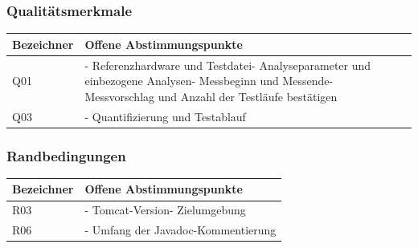 \documentclass[a4paper,10pt]{article}
\begin{document}
        \subsubsection*{Qualitätsmerkmale}
        \begin{longtable}{>{\raggedright\arraybackslash}p{}>{\raggedright\arraybackslash}p{}}

            \toprule
            \textbf{Bezeichner} & \textbf{Offene Abstimmungspunkte}                                                                                                                                                  \\
            \midrule\endhead
            \bottomrule\endfoot
            Q01                 & - Referenzhardware und Testdatei\newline - Analyseparameter und einbezogene Analysen\newline - Messbeginn und Messende\newline - Messvorschlag und Anzahl der Testläufe bestätigen \\
            \midrule
            Q03                 & - Quantifizierung und Testablauf                                                                                                                                                   \\
        \end{longtable}
\addtocounter{table}{-1}
        

        \subsubsection*{Randbedingungen}
        \begin{longtable}{>{\raggedright\arraybackslash}p{}>{\raggedright\arraybackslash}p{}}

            \toprule
            \textbf{Bezeichner} & \textbf{Offene Abstimmungspunkte}       \\
            \midrule\endhead
            \bottomrule\endfoot
            R03                 & - Tomcat-Version\newline - Zielumgebung \\
            \midrule
            R06                 & - Umfang der Javadoc-Kommentierung      \\
        \end{longtable}
\addtocounter{table}{-1}
\end{document}
